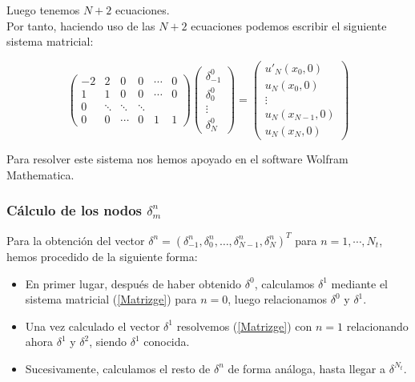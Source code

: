 Luego tenemos $N+2$ ecuaciones.\\

 
 Por tanto, haciendo uso de las $N+2$ ecuaciones podemos escribir el siguiente sistema matricial:
 
 \begin{equation}
    \begin{pmatrix}
        -2 & 2 & 0 & 0 & \cdots & 0\\
        1 & 1 & 0 & 0 &  \cdots & 0\\
        0 & \ddots & \ddots & \ddots\\
        0 & 0 & \cdots & 0 & 1 & 1
    \end{pmatrix}
    \begin{pmatrix}
       \delta_{-1}^{0} \\
       \delta_{0}^{0}\\
        \vdots\\
        \delta_{N}^{0}
    \end{pmatrix}
    =
        \begin{pmatrix}
       u'_{N}(x_{0},0) \\
       u_{N}(x_{0},0)\\
        \vdots\\
        u_{N}(x_{N-1},0)\\
        u_{N}(x_{N},0)
    \end{pmatrix}
\end{equation}

Para resolver este sistema nos hemos apoyado en el software Wolfram Mathematica.
 
 \subsubsection{Cálculo de los nodos $\delta^{n}_{m}$}
 
Para la obtención del vector $\delta^{n}=(\delta_{-1}^{n},\delta_{0}^{n},\dots,\delta_{N-1}^{n},\delta_{N}^{n})^{T}$ para $n=1,\cdots,N_{t}$, hemos procedido de la siguiente forma:

\begin{itemize}
    \item En primer lugar, después de haber obtenido $\delta^{0}$, calculamos $\delta^{1}$ mediante el sistema matricial (\ref{Matrizge}) para $n=0$, luego relacionamos $\delta^{0}$ y $\delta^{1}$.

    \item Una vez calculado el vector $\delta^{1}$ resolvemos (\ref{Matrizge}) con $n=1$ relacionando ahora $\delta^{1}$ y $\delta^{2}$, siendo $\delta^{1}$ conocida.

    \item Sucesivamente, calculamos el resto de $\delta^{n}$ de forma análoga, hasta llegar a $\delta^{N_{t}}$.
\end{itemize}
 
